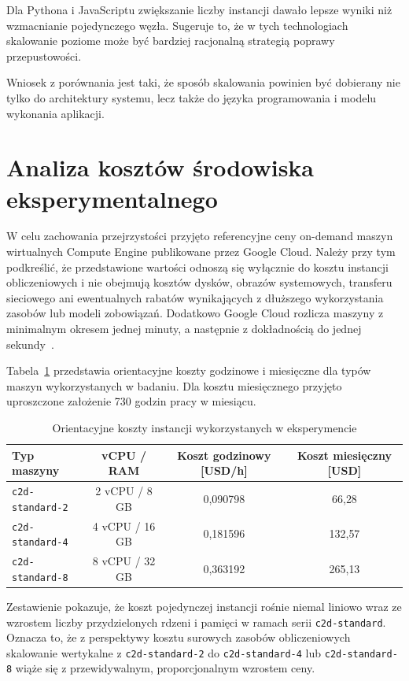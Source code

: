 Dla Pythona i JavaScriptu zwiększanie liczby instancji dawało lepsze wyniki niż wzmacnianie pojedynczego węzła. Sugeruje to, że w tych technologiach skalowanie poziome może być bardziej racjonalną strategią poprawy przepustowości.

Wniosek z porównania jest taki, że sposób skalowania powinien być dobierany nie tylko do architektury systemu, lecz także do języka programowania i modelu wykonania aplikacji.

\section{Analiza kosztów środowiska eksperymentalnego}

W celu zachowania przejrzystości przyjęto referencyjne ceny on-demand maszyn wirtualnych Compute Engine publikowane przez Google Cloud. Należy przy tym podkreślić, że przedstawione wartości odnoszą się wyłącznie do kosztu instancji obliczeniowych i nie obejmują kosztów dysków, obrazów systemowych, transferu sieciowego ani ewentualnych rabatów wynikających z dłuższego wykorzystania zasobów lub modeli zobowiązań. Dodatkowo Google Cloud rozlicza maszyny z minimalnym okresem jednej minuty, a następnie z dokładnością do jednej sekundy~\cite{gcp_vm_pricing}.

Tabela~\ref{tab:vm-costs} przedstawia orientacyjne koszty godzinowe i miesięczne dla typów maszyn wykorzystanych w badaniu. Dla kosztu miesięcznego przyjęto uproszczone założenie 730 godzin pracy w miesiącu.

\begin{table}[H]
    \centering
    \caption{Orientacyjne koszty instancji wykorzystanych w eksperymencie}
    \label{tab:vm-costs}
    \renewcommand{\arraystretch}{1.15}
    \begin{tabular}{|l|c|c|c|}
        \hline
        \textbf{Typ maszyny} & \textbf{vCPU / RAM} & \textbf{Koszt godzinowy [USD/h]} & \textbf{Koszt miesięczny [USD]} \\
        \hline
        \texttt{c2d-standard-2} & 2 vCPU / 8 GB & 0{,}090798 & 66{,}28 \\
        \texttt{c2d-standard-4} & 4 vCPU / 16 GB & 0{,}181596 & 132{,}57 \\
        \texttt{c2d-standard-8} & 8 vCPU / 32 GB & 0{,}363192 & 265{,}13 \\
        \hline
    \end{tabular}
\end{table}

Zestawienie pokazuje, że koszt pojedynczej instancji rośnie niemal liniowo wraz ze wzrostem liczby przydzielonych rdzeni i pamięci w ramach serii \texttt{c2d-standard}. Oznacza to, że z perspektywy kosztu surowych zasobów obliczeniowych skalowanie wertykalne z \texttt{c2d-standard-2} do \texttt{c2d-standard-4} lub \texttt{c2d-standard-8} wiąże się z przewidywalnym, proporcjonalnym wzrostem ceny.

